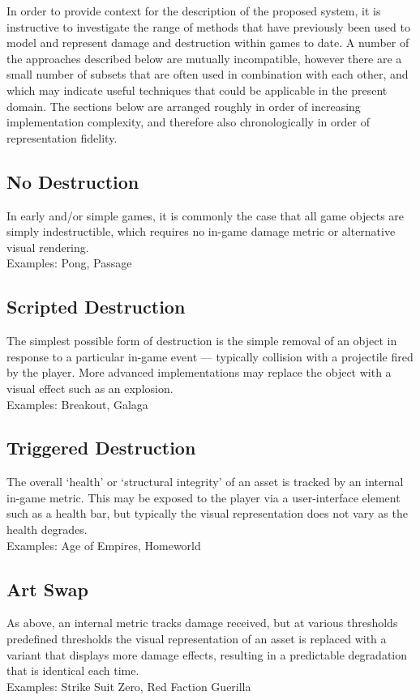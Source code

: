 \documentclass[11pt]{report}
\begin{document}
		In order to provide context for the description of the proposed system, it is instructive to investigate the range of methods that have previously been used to model and represent damage and destruction within games to date. A number of the approaches described below are mutually incompatible, however there are a small number of subsets that are often used in combination with each other, and which may indicate useful techniques that could be applicable in the present domain. The sections below are arranged roughly in order of increasing implementation complexity, and therefore also chronologically in order of representation fidelity.

		\subsection{No Destruction}
			In early and/or simple games, it is commonly the case that all game objects are simply indestructible, which requires no in-game damage metric or alternative visual rendering.\\
			Examples: Pong, Passage

		\subsection{Scripted Destruction}
			The simplest possible form of destruction is the simple removal of an object in response to a particular in-game event --- typically collision with a projectile fired by the player. More advanced implementations may replace the object with a visual effect such as an explosion.\\
			Examples: Breakout, Galaga

		\subsection{Triggered Destruction}
			The overall `health' or `structural integrity' of an asset is tracked by an internal in-game metric. This may be exposed to the player via a user-interface element such as a health bar, but typically the visual representation does not vary as the health degrades. \\
			Examples: Age of Empires, Homeworld

		\subsection{Art Swap}
			As above, an internal metric tracks damage received, but at various thresholds predefined thresholds the visual representation of an asset is replaced with a variant that displays more damage effects, resulting in a predictable degradation that is identical each time. \\
			Examples: Strike Suit Zero, Red Faction Guerilla
\end{document}
